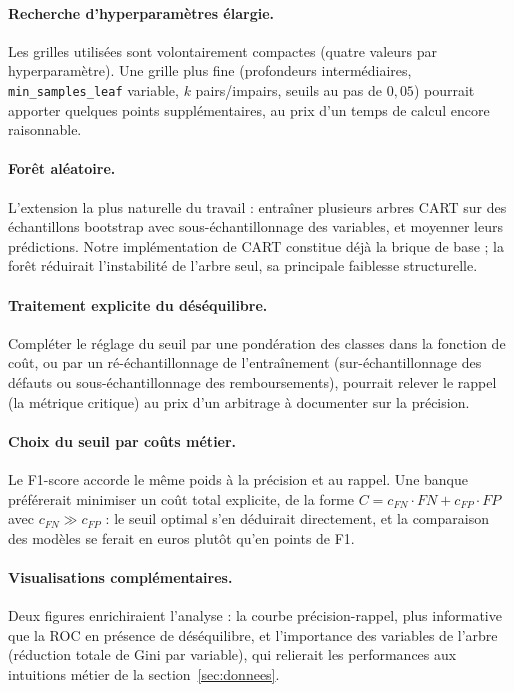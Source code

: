 \paragraph{Recherche d'hyperparamètres élargie.}
Les grilles utilisées sont volontairement compactes (quatre valeurs par
hyperparamètre). Une grille plus fine (profondeurs intermédiaires,
\texttt{min\_samples\_leaf} variable, $k$ pairs/impairs, seuils au pas de
$0{,}05$) pourrait apporter quelques points supplémentaires, au prix d'un
temps de calcul encore raisonnable.

\paragraph{Forêt aléatoire.}
L'extension la plus naturelle du travail : entraîner plusieurs arbres CART sur
des échantillons bootstrap avec sous-échantillonnage des variables, et moyenner
leurs prédictions. Notre implémentation de CART constitue déjà la brique de
base ; la forêt réduirait l'instabilité de l'arbre seul, sa principale
faiblesse structurelle.

\paragraph{Traitement explicite du déséquilibre.}
Compléter le réglage du seuil par une pondération des classes dans la fonction
de coût, ou par un ré-échantillonnage de l'entraînement (sur-échantillonnage
des défauts ou sous-échantillonnage des remboursements), pourrait relever le
rappel (la métrique critique) au prix d'un arbitrage à documenter sur la
précision.

\paragraph{Choix du seuil par coûts métier.}
Le F1-score accorde le même poids à la précision et au rappel. Une banque
préférerait minimiser un coût total explicite, de la forme
$C = c_{FN} \cdot FN + c_{FP} \cdot FP$ avec $c_{FN} \gg c_{FP}$ : le seuil
optimal s'en déduirait directement, et la comparaison des modèles se ferait en
euros plutôt qu'en points de F1.

\paragraph{Visualisations complémentaires.}
Deux figures enrichiraient l'analyse : la courbe précision-rappel, plus
informative que la ROC en présence de déséquilibre, et l'importance des
variables de l'arbre (réduction totale de Gini par variable), qui relierait
les performances aux intuitions métier de la section~\ref{sec:donnees}.
